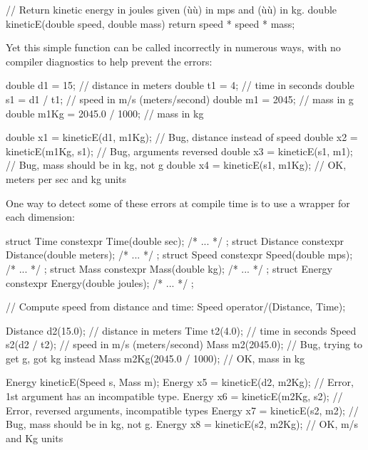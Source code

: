 \begin{emcppslisting}[emcppsbatch=e20]
// Return kinetic energy in joules given (ù{}ù) in mps and (ù{}ù) in kg.
double kineticE(double speed, double mass)
{
    return speed * speed * mass;
}
\end{emcppslisting}
    
\noindent Yet this simple function can be called incorrectly in numerous ways,
with no compiler diagnostics to help prevent the errors:

\begin{emcppslisting}[emcppsbatch=e20]
double d1   = 15;             // distance in meters
double t1   = 4;              // time in seconds
double s1   = d1 / t1;        // speed in m/s (meters/second)
double m1   = 2045;           // mass in g
double m1Kg = 2045.0 / 1000;  // mass in kg

double x1 = kineticE(d1, m1Kg);  // Bug, distance instead of speed
double x2 = kineticE(m1Kg, s1);  // Bug, arguments reversed
double x3 = kineticE(s1, m1);    // Bug, mass should be in kg, not g
double x4 = kineticE(s1, m1Kg);  // OK, meters per sec and kg units
\end{emcppslisting}
    
\noindent One way to detect some of these errors at compile time is to use a
wrapper for each dimension:

\begin{emcppslisting}[emcppsbatch=e20]
struct Time     { constexpr Time(double sec);        /* ... */ };
struct Distance { constexpr Distance(double meters); /* ... */ };
struct Speed    { constexpr Speed(double mps);       /* ... */ };
struct Mass     { constexpr Mass(double kg);         /* ... */ };
struct Energy   { constexpr Energy(double joules);   /* ... */ };

// Compute speed from distance and time:
Speed operator/(Distance, Time);

Distance d2(15.0);             // distance in meters
Time     t2(4.0);              // time in seconds
Speed    s2(d2 / t2);          // speed in m/s (meters/second)
Mass     m2(2045.0);           // Bug, trying to get g, got kg instead
Mass     m2Kg(2045.0 / 1000);  // OK, mass in kg

Energy kineticE(Speed s, Mass m);
Energy x5 = kineticE(d2, m2Kg); // Error, 1st argument has an incompatible type.
Energy x6 = kineticE(m2Kg, s2); // Error, reversed arguments, incompatible types
Energy x7 = kineticE(s2, m2);   // Bug, mass should be in kg, not g.
Energy x8 = kineticE(s2, m2Kg); // OK, m/s and Kg units
\end{emcppslisting}
    
